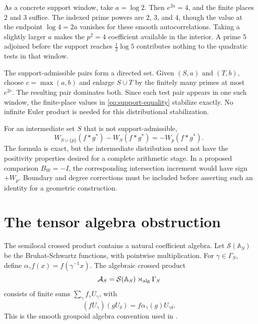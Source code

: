 \documentclass[11pt,letterpaper]{article}
\theoremstyle{definition}
\theoremstyle{remark}
\newcommand{\Sch}{\mathcal S}
\begin{document}
As a concrete support window, take $a=\log2$. Then
$e^{2a}=4$, and the finite places $2$ and $3$ suffice. The indexed
prime powers are $2$, $3$, and $4$, though the value at the endpoint
$\log4=2a$ vanishes for these smooth autocorrelations. Taking a
slightly larger $a$ makes the $p^2=4$ coefficient available in the
interior. A prime $5$ adjoined before the support reaches
$\tfrac12\log5$ contributes nothing to the quadratic tests in that
window.

The support-admissible pairs form a directed set. Given
$(S,a)$ and $(T,b)$, choose $c=\max(a,b)$ and enlarge $S\cup T$
by the finitely many primes at most $e^{2c}$. The resulting pair
dominates both. Since each test pair appears in one such window,
the finite-place values in \eqref{eq:support-equality} stabilize
exactly. No infinite Euler product is needed for this distributional
stabilization.

For an intermediate set $S$ that is not support-admissible,
\begin{equation}\label{eq:finite-increment}
 W_{S\cup\{p\}}(f*g^*)-W_S(f*g^*)=-W_p(f*g^*).
\end{equation}
The formula is exact, but the intermediate distribution need not
have the positivity properties desired for a complete arithmetic
stage. In a proposed comparison $B_W=-I$, the corresponding
intersection increment would have sign $+W_p$. Boundary and degree
corrections must be included before asserting such an identity for
a geometric construction.

\section{The tensor algebra obstruction}

The semilocal crossed product contains a natural coefficient
algebra. Let $\Sch(\mathbb A_S)$ be the Bruhat-Schwartz functions,
with pointwise multiplication. For $\gamma\in\Gamma_S$, define
$\alpha_\gamma f(x)=f(\gamma^{-1}x)$. The algebraic crossed product
\begin{equation}\label{eq:crossed-product}
 \mathcal A_S=\Sch(\mathbb A_S)\rtimes_{\rm alg}\Gamma_S
\end{equation}
consists of finite sums $\sum_\gamma f_\gamma U_\gamma$, with
\begin{equation}\label{eq:crossed-product-multiplication}
 (fU_\gamma)(gU_\delta)
        =f\alpha_\gamma(g)U_{\gamma\delta}.
\end{equation}
This is the smooth groupoid algebra convention used in
\cite[Section 4, equations (4.3) to (4.6)]{CCMar}.
\end{document}

